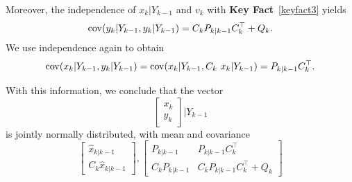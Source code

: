 Moreover, the independence of $x_k|Y_{k-1}$ and $v_k$ with \textbf{Key Fact}~\ref{keyfact3} yields
$$ \mathrm{cov}(y_k|Y_{k-1}, y_k|Y_{k-1}) = C_k P_{k|k-1} C_k^\top  + Q_k.$$
We use independence again to obtain
$$\mathrm{cov}(x_k|Y_{k-1},y_k |Y_{k-1}) = \mathrm{cov}(x_k|Y_{k-1},C_k ~x_k|Y_{k-1})=P_{k|k-1} C_k^\top.$$

%


With this information, we conclude that  the vector
$$ \left[ \begin{array}{c} x_k\\y_k \end{array} \right] | Y_{k-1}$$
is jointly normally distributed, with mean and covariance
\begin{equation}
\label{eq:xkykGivenYkminus1}
\left[ \begin{array}{r} \widehat{x}_{k|k-1} \\ C_k  \widehat{x}_{k|k-1} \end{array} \right], \left[ \begin{array}{cc}  P_{k|k-1} &  P_{k|k-1} C_k^\top\\ C_k  P_{k|k-1} & C_k P_{k|k-1} C_k^\top  + Q_k \end{array} \right]
\end{equation}


